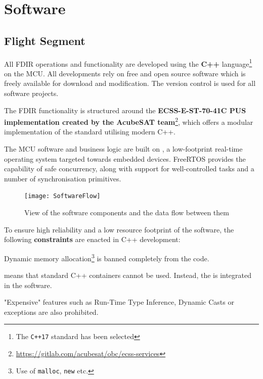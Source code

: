 \documentclass[a4paper,nobib]{tufte-book}
\begin{document}
\section{Software}

\subsection{Flight Segment}

All \ac{FDIR} operations and functionality are developed using the \textbf{C++} language\footnote{The \texttt{C++17} standard has been selected} on the \ac{MCU}. All developments rely on free and open source software which is freely available for download and modification. The  version control is used for all software projects.

The \ac{FDIR} functionality is structured around the \textbf{ECSS-E-ST-70-41C \ac{PUS} implementation created by the AcubeSAT team}\footnote{\url{https://gitlab.com/acubesat/obc/ecss-services}}, which offers a modular implementation of the standard utilising modern C++.

The \ac{MCU} software and business logic are built on \textbf{}, a low-footprint real-time operating system targeted towards embedded devices. FreeRTOS provides the capability of safe concurrency, along with support for well-controlled tasks and a number of synchronisation primitives.

\begin{figure}[h]
	\texttt{[image: SoftwareFlow]}
	\caption{View of the software components and the data flow between them}
	\label{sec:softwareflow}
\end{figure}

To ensure high reliability and a low resource footprint of the software, the following \textbf{constraints} are enacted in C++ development:
\begin{compactenum}
	\item Dynamic memory allocation\footnote{Use of \texttt{malloc}, \texttt{new} etc.} is banned completely from the code.
	\label{itm:malloc}
	\item {} means that standard C++ containers cannot be used. Instead, the  is integrated in the software.
	\item "Expensive" features such as Run-Time Type Inference, Dynamic Casts or exceptions are also prohibited.
\end{compactenum}
\end{document}
